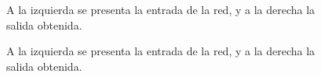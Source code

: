 \documentclass{article}
\begin{document}
\begin{center}
\begin{figure}[h!]

 \caption{A la izquierda se presenta la entrada de la red, y a la derecha la salida obtenida.}
 \label{Fig:spu1}
\end{figure}

\begin{figure}[h!]
 \centering
 

 \caption{A la izquierda se presenta la entrada de la red, y a la derecha la salida obtenida.}
 \label{Fig:spu2}
\end{figure}


\end{center}
\end{document}
